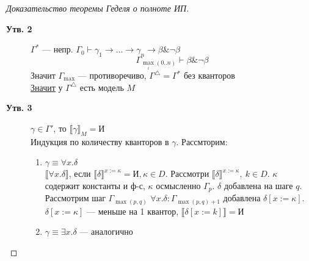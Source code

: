 \documentclass[english]{article}
\newcommand{\llb}{\llbracket}
\newcommand{\rrb}{\rrbracket}
\theoremstyle{plain}
\theoremstyle{remark}
\theoremstyle{definition}
\begin{document}
\begin{proof}[Доказательство теоремы Геделя о полноте ИП]
\begin{description}
\begin{description}
\end{description}
\item[{\textbf{Утв. 2}}] \(\Gamma^*\) --- непр. \(\Gamma_0 \vdash \gamma_1 \to \dots \to \gamma_n \to \beta \& \neg \beta\)
\[ \Gamma_{\max_i(0..n)} \vdash \beta \& \neg \beta \]
Значит \(\Gamma_\max\) --- противоречиво, \(\Gamma^\triangle = \Gamma^*\) без кванторов \\
\uline{Значит} у \(\Gamma^\triangle\) есть модель \(M\)
\item[{\textbf{Утв. 3}}] \(\gamma \in \Gamma'\), то \(\llb \gamma \rrb_M = \text{И}\) \\
Индукция по количеству кванторов в \(\gamma\). Рассмторим:
\begin{enumerate}
\item \(\gamma \equiv \forall x. \delta\) \\
\(\llb \forall x. \delta \rrb\), если \(\llb \delta \rrb^{x := \kappa} = \text{И}, \kappa \in D\). Рассмотри \(\llb \delta \rrb^{x := \kappa},\ k \in D\). \(\kappa\) содержит константы и ф-с, \(\kappa\) осмысленно \(\Gamma_p\). \(\delta\) добавлена на шаге \(q\). Рассмотрим шаг \(\Gamma_{\max(p, q)}\) \(\forall x. \delta: \Gamma_{\max(p, q) + 1}\) добавлена \(\delta[x:=\kappa]\). \(\delta[x:=\kappa]\) --- меньше на 1 квантор, \(\llb \delta[x:=k] \rrb = \text{И}\)
\item \(\gamma \equiv \exists x. \delta\) --- аналогично
\end{enumerate}
\end{description}
\end{proof}
\end{document}
